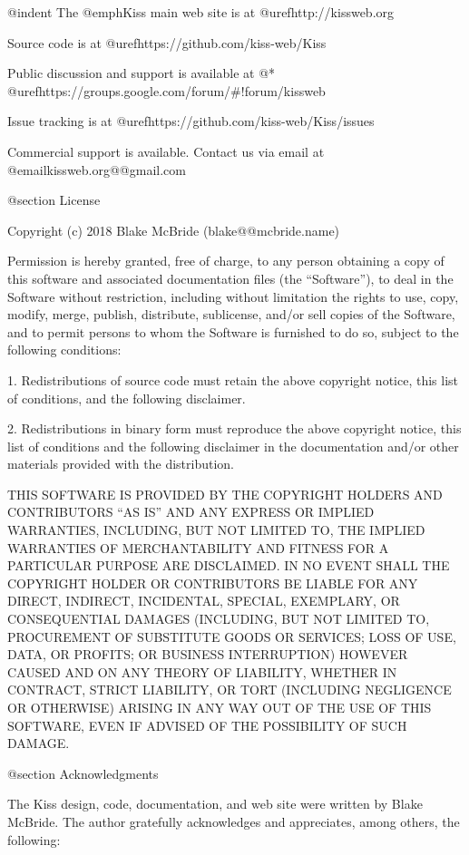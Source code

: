 @indent
The @emph{Kiss} main web site is at @uref{http://kissweb.org}

Source code is at @uref{https://github.com/kiss-web/Kiss}

Public discussion and support is available at @* @uref{https://groups.google.com/forum/#!forum/kissweb}

Issue tracking is at @uref{https://github.com/kiss-web/Kiss/issues}

Commercial support is available.  Contact us via email at @email{kissweb.org@@gmail.com}

@section License

Copyright (c) 2018 Blake McBride (blake@@mcbride.name)

Permission is hereby granted, free of charge, to any person obtaining
a copy of this software and associated documentation files (the
``Software''), to deal in the Software without restriction, including
without limitation the rights to use, copy, modify, merge, publish,
distribute, sublicense, and/or sell copies of the Software, and to
permit persons to whom the Software is furnished to do so, subject to
the following conditions:

1. Redistributions of source code must retain the above copyright
notice, this list of conditions, and the following disclaimer.

2. Redistributions in binary form must reproduce the above copyright
notice, this list of conditions and the following disclaimer in the
documentation and/or other materials provided with the distribution.

THIS SOFTWARE IS PROVIDED BY THE COPYRIGHT HOLDERS AND CONTRIBUTORS
``AS IS'' AND ANY EXPRESS OR IMPLIED WARRANTIES, INCLUDING, BUT NOT
LIMITED TO, THE IMPLIED WARRANTIES OF MERCHANTABILITY AND FITNESS FOR
A PARTICULAR PURPOSE ARE DISCLAIMED. IN NO EVENT SHALL THE COPYRIGHT
HOLDER OR CONTRIBUTORS BE LIABLE FOR ANY DIRECT, INDIRECT, INCIDENTAL,
SPECIAL, EXEMPLARY, OR CONSEQUENTIAL DAMAGES (INCLUDING, BUT NOT
LIMITED TO, PROCUREMENT OF SUBSTITUTE GOODS OR SERVICES; LOSS OF USE,
DATA, OR PROFITS; OR BUSINESS INTERRUPTION) HOWEVER CAUSED AND ON ANY
THEORY OF LIABILITY, WHETHER IN CONTRACT, STRICT LIABILITY, OR TORT
(INCLUDING NEGLIGENCE OR OTHERWISE) ARISING IN ANY WAY OUT OF THE USE
OF THIS SOFTWARE, EVEN IF ADVISED OF THE POSSIBILITY OF SUCH DAMAGE.

@section Acknowledgments

The Kiss design, code, documentation, and web site were written by Blake
McBride.  The author gratefully acknowledges and appreciates, among others, the following:


